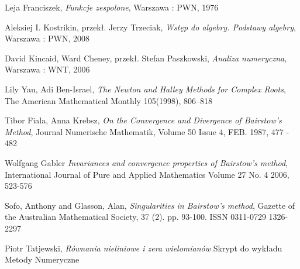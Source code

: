 \documentclass{article}
\begin{document}
\begin{thebibliography}{99}
 Leja Franciszek,
\emph{Funkcje zespolone},
Warszawa : PWN, 1976

 Aleksiej I. Kostrikin, przekł. Jerzy Trzeciak,
\emph{Wstęp do algebry. Podstawy algebry},
Warszawa : PWN, 2008

 David Kincaid, Ward Cheney, przekł. Stefan Paszkowski,
\emph{Analiza numeryczna},
Warszawa : WNT, 2006

Lily Yau, Adi Ben-Israel,
\emph{The Newton and Halley Methods for Complex Roots},
The American Mathematical Monthly 105(1998), 806–818

Tibor Fiala, Anna Krebsz,
\emph{On the Convergence and Divergence of Bairstow's Method},
Journal Numerische Mathematik, Volume 50 Issue 4, FEB. 1987, 477 - 482

Wolfgang Gabler
\emph{Invariances and convergence properties of Bairstow's method},
International Journal of Pure and Applied Mathematics Volume 27 No. 4 2006, 523-576

Sofo, Anthony and Glasson, Alan,
\emph{Singularities in Bairstow’s method},
Gazette of the Australian Mathematical Society, 37 (2). pp. 93-100. ISSN 0311-0729 1326-2297

Piotr Tatjewski,
\emph{Równania nieliniowe i zera wielomianów}
Skrypt do wykładu Metody Numeryczne

\end{thebibliography}
\end{document}
